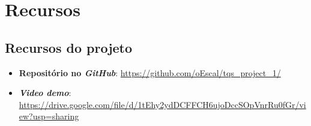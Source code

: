 
\chapter{Recursos}
\section{Recursos do projeto}

\begin{itemize}
   \item \textbf{Repositório no \textit{GitHub}}: \url{https://github.com/oEscal/tqs_project_1/}
   \item \textbf{\textit{Video demo}}: \url{https://drive.google.com/file/d/1tEhy2ydDCFFCH6ujoDccSOpVnrRu0fGr/view?usp=sharing}
\end{itemize}
